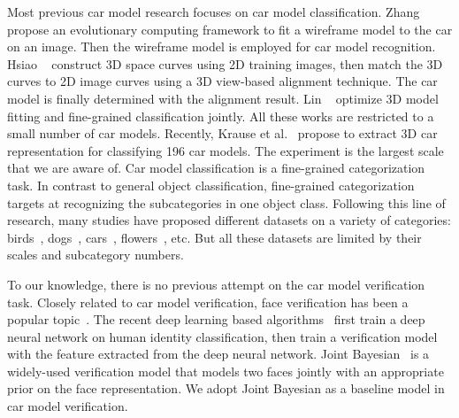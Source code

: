 \documentclass[10pt,twocolumn,letterpaper]{article}
\begin{document}
Most previous car model research focuses on car model classification. Zhang \etal~\cite{Zhang12} propose an evolutionary computing framework to fit a wireframe model to the car on an image. Then the wireframe model is employed for car model recognition.
%
Hsiao \etal~\cite{Hsiao14} construct 3D space curves using 2D training images, then match the 3D curves to 2D image curves using a 3D view-based alignment technique. The car model is finally determined with the alignment result.
%
Lin \etal~\cite{Lin14} optimize 3D model fitting and fine-grained classification jointly. All these works are restricted to a small number of car models. Recently, Krause et al.~\cite{Krause13} propose to extract 3D car representation for classifying 196 car models. The experiment is the largest scale that we are aware of.
%
Car model classification is a fine-grained categorization task.
%
In contrast to general object classification, fine-grained categorization targets at recognizing the subcategories in one object class. Following this line of research, many studies have proposed different datasets on a variety of categories: birds~\cite{CUB_200}, dogs~\cite{Liu12dog}, cars~\cite{Krause13}, flowers~\cite{Nilsback08}, etc. But all these datasets are limited by their scales and subcategory numbers.

To our knowledge, there is no previous attempt on the car model verification task.
%
Closely related to car model verification, face verification has been a popular topic~\cite{LFWTech,Kumar09,Sun14,ZhuNIPS2014}. The recent deep learning based algorithms~\cite{Sun14} first train a deep neural network on human identity classification, then train a verification model with the feature extracted from the deep neural network. Joint Bayesian~\cite{Chen12} is a widely-used verification model that models two faces jointly with an appropriate prior on the face representation. We adopt Joint Bayesian as a baseline model in car model verification.

\end{document}
